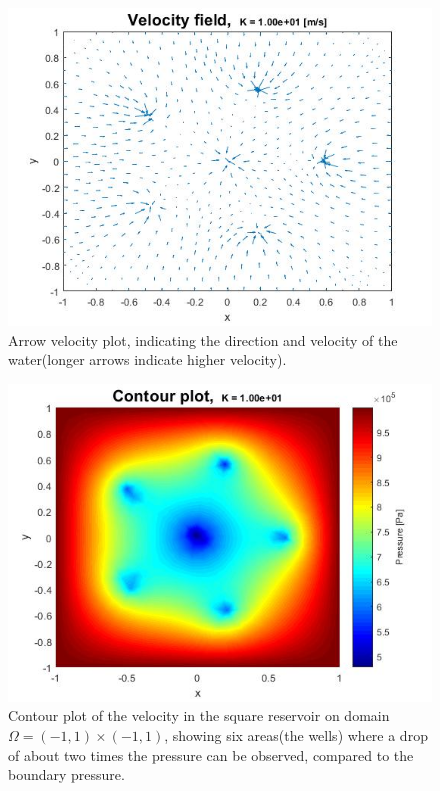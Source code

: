 \documentclass[a4paper]{report}
\begin{document}
\begin{figure}[ht!]
	\centering
	\includegraphics[width=130mm]{2Dvarrowsk10.jpg}
	\caption{Arrow velocity plot, indicating the direction and velocity of the water(longer arrows indicate higher velocity).
	\label{overflow}}
\end{figure}

\begin{figure}
	\centering
	\includegraphics[width=130mm]{2Dvheatk10.jpg}
	\caption{Contour plot of the velocity in the square reservoir on domain $\Omega=(-1,1)\times(-1,1)$, showing six areas(the wells) where a drop of about two times the pressure can be observed, compared to the boundary pressure.
	\label{overflow}}
\end{figure}
\end{document}
